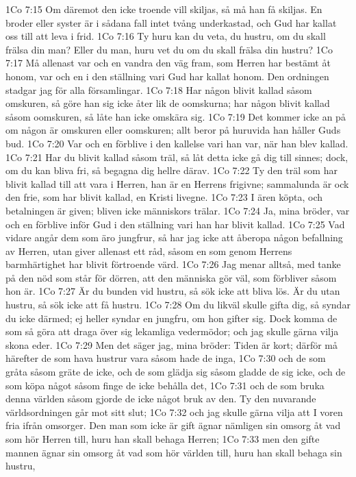 1Co 7:15  Om däremot den icke troende vill skiljas, så må han få skiljas. En broder eller syster är i sådana fall intet tvång underkastad, och Gud har kallat oss till att leva i frid.
1Co 7:16  Ty huru kan du veta, du hustru, om du skall frälsa din man? Eller du man, huru vet du om du skall frälsa din hustru?
1Co 7:17  Må allenast var och en vandra den väg fram, som Herren har bestämt åt honom, var och en i den ställning vari Gud har kallat honom. Den ordningen stadgar jag för alla församlingar.
1Co 7:18  Har någon blivit kallad såsom omskuren, så göre han sig icke åter lik de oomskurna; har någon blivit kallad såsom oomskuren, så låte han icke omskära sig.
1Co 7:19  Det kommer icke an på om någon är omskuren eller oomskuren; allt beror på huruvida han håller Guds bud.
1Co 7:20  Var och en förblive i den kallelse vari han var, när han blev kallad.
1Co 7:21  Har du blivit kallad såsom träl, så låt detta icke gå dig till sinnes; dock, om du kan bliva fri, så begagna dig hellre därav.
1Co 7:22  Ty den träl som har blivit kallad till att vara i Herren, han är en Herrens frigivne; sammalunda är ock den frie, som har blivit kallad, en Kristi livegne.
1Co 7:23  I ären köpta, och betalningen är given; bliven icke människors trälar.
1Co 7:24  Ja, mina bröder, var och en förblive inför Gud i den ställning vari han har blivit kallad.
1Co 7:25  Vad vidare angår dem som äro jungfrur, så har jag icke att åberopa någon befallning av Herren, utan giver allenast ett råd, såsom en som genom Herrens barmhärtighet har blivit förtroende värd.
1Co 7:26  Jag menar alltså, med tanke på den nöd som står för dörren, att den människa gör väl, som förbliver såsom hon är.
1Co 7:27  Är du bunden vid hustru, så sök icke att bliva lös. Är du utan hustru, så sök icke att få hustru.
1Co 7:28  Om du likväl skulle gifta dig, så syndar du icke därmed; ej heller syndar en jungfru, om hon gifter sig. Dock komma de som så göra att draga över sig lekamliga vedermödor; och jag skulle gärna vilja skona eder.
1Co 7:29  Men det säger jag, mina bröder: Tiden är kort; därför må härefter de som hava hustrur vara såsom hade de inga,
1Co 7:30  och de som gråta såsom gräte de icke, och de som glädja sig såsom gladde de sig icke, och de som köpa något såsom finge de icke behålla det,
1Co 7:31  och de som bruka denna världen såsom gjorde de icke något bruk av den. Ty den nuvarande världsordningen går mot sitt slut;
1Co 7:32  och jag skulle gärna vilja att I voren fria ifrån omsorger. Den man som icke är gift ägnar nämligen sin omsorg åt vad som hör Herren till, huru han skall behaga Herren;
1Co 7:33  men den gifte mannen ägnar sin omsorg åt vad som hör världen till, huru han skall behaga sin hustru,
